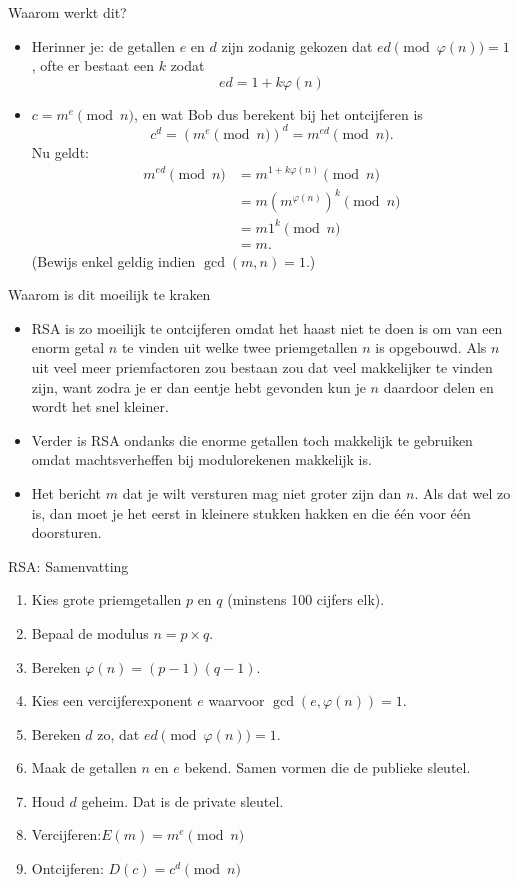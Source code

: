 \documentclass{beamer}
\begin{document}
\begin{frame}{Waarom werkt dit? }
\begin{itemize}
	\item 	Herinner je: de getallen $e$ en $d$ zijn zodanig gekozen dat $ e d \pmod{\varphi(n)} = 1$, ofte er bestaat een $k$ zodat
	\[
	ed = 1 + k \varphi(n)
	\]
	\item  $c = m^e\pmod{n}$, en wat Bob dus berekent bij het ontcijferen is
	\[
	c^d = (m^e \pmod{n})^d = m^{ed} \pmod{n}.
	\]	
	Nu geldt:
	\begin{align*}
	 m^{ed} \pmod{n} & = m^{1 + k\varphi(n)} \pmod{n} \\
	                 & = m ( m^{\varphi(n)})^k \pmod{n} \\
	                 & = m 1^k \pmod{n} \\
	                 & = m.
	\end{align*}
	(\tiny{Bewijs enkel geldig indien $\gcd(m, n) = 1$.})
\end{itemize}
\end{frame}

\begin{frame}{Waarom is dit moeilijk te kraken}
	\begin{itemize}
		\item RSA is zo moeilijk te ontcijferen omdat het haast niet te doen is om van een enorm getal $n$ te vinden uit welke twee priemgetallen $n$ is opgebouwd. Als $n$ uit veel meer priemfactoren zou bestaan zou dat veel makkelijker te vinden zijn, want zodra je er dan eentje hebt gevonden kun je $n$ daardoor delen en wordt het snel kleiner.
		\item Verder is RSA ondanks die enorme getallen toch  makkelijk te gebruiken omdat machtsverheffen bij modulorekenen makkelijk is.
		\item 	Het bericht $m$ dat je wilt versturen mag niet groter zijn dan $n$. Als dat wel zo is, dan moet je het eerst in kleinere stukken hakken en die \'e\'en voor \'e\'en doorsturen.
	\end{itemize}


\end{frame}


\begin{frame}{RSA: Samenvatting}
	\begin{enumerate}
		\item Kies grote priemgetallen $p$ en $q$ (minstens 100 cijfers elk).
		\item Bepaal de modulus $n = p \times q$.
		\item Bereken $\varphi(n) = (p-1)(q-1)$.
		\item Kies een vercijferexponent $e$ waarvoor $\gcd(e,\varphi(n)) = 1$.
		\item Bereken $d$ zo, dat $e d  \pmod{\varphi(n)} = 1$.
		\item Maak de getallen $n$ en $e$ bekend. Samen vormen die de publieke sleutel.
		\item Houd $d$ geheim. Dat is de private sleutel.
		\item Vercijferen:$ E(m) = m^e \pmod{n}$
		\item Ontcijferen: $D(c) = c^d \pmod{n}$
	\end{enumerate}
\end{frame}
\end{document}
